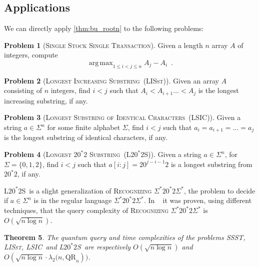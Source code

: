 \documentclass[12pt]{article}
\newcommand{\qr}{\mathrm{QR}}
\DeclareMathOperator*{\argmax}{arg\,max}
\newcommand{\SSSTf}{\textsc{Single Stock Single Transaction}}
\newcommand{\SSST}{\textsc{SSST}}
\newcommand{\LSICf}{\textsc{Longest Substring of Identical Characters}}
\newcommand{\LSIC}{\textsc{LSIC}}
\newcommand{\LISstf}{\textsc{Longest Increasing Substring}}
\newcommand{\LISst}{\textsc{LISst}}
\newcommand{\Recognizing}{\textsc{Recognizing}}
\newcommand{\LZSf}{\textsc{Longest} $20^*2$ \textsc{Substring}}
\newcommand{\LZS}{\textsc{L}$20^*2$\textsc{S}}
\newtheorem{theorem}{Theorem}
\theoremstyle{definition}
\newtheorem{problem}[theorem]{Problem}
\begin{document}
\subsection{Applications}
We can directly apply \cref{thm:bu_rootn} to the following problems:

\begin{problem}[\SSSTf]
Given a length $n$ array $A$ of integers, compute 
\[
\argmax_{1 \leq i < j \leq n} A_j - A_i \enspace .
\]
\end{problem}

\begin{problem}[\LISstf \ (\LISst)]
Given an array $A$ consisting of $n$ integers, find $ i < j $ such that $A_i < A_{i+1} \ldots < A_j$ is the longest increasing substring, if any.
\end{problem}

\begin{problem}[\LSICf \ (\LSIC)]
Given a string $a \in \Sigma^n$ for some finite alphabet $\Sigma$, find $i<j$ such that $a_i = a_{i+1} = \ldots = a_j$ is the longest substring of identical characters, if any.
\end{problem}

\begin{problem}[\LZSf \ (\LZS)]
Given a string $a \in \Sigma^n$, for $\Sigma = \{0,1,2\}$, find $i <j$ such that $a[i:j] = 20^{j-i-1}2$ is a longest substring from $20^*2$, if any.
\end{problem}

\LZS \ is a slight generalization of {\Recognizing} $\Sigma^{*}20^*2\Sigma^{*}$, the problem to decide if $a \in \Sigma^{n}$ is in the regular language $\Sigma^{*}20^*2\Sigma^{*}$.
In ~\cite{AGS19, CKKSW22} it was proven, using different techniques, that the query complexity of {\Recognizing} $\Sigma^{*}20^*2\Sigma^{*}$ is $O(\sqrt{n \log n})$.

\begin{theorem}
\label{thm:three}
The quantum query and time complexities of the problems \SSST, \LISst, \LSIC \ and \LZS \ are respectively $O(\sqrt{n \log n})$ and $O({\sqrt{n \log n} \cdot \lambda_2 (n, \qr_n}))$.
\end{theorem}
\end{document}
